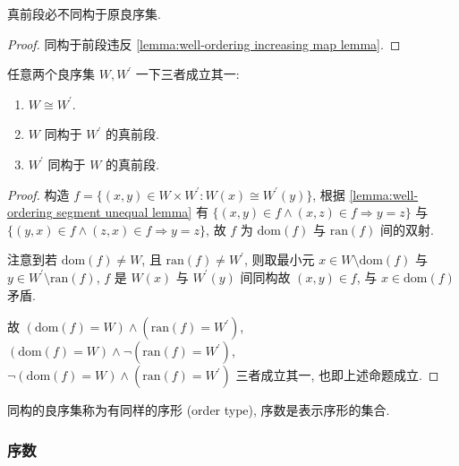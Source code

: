 \begin{lemma}
    \label{lemma:well-ordering segment unequal lemma}
    真前段必不同构于原良序集.

    \begin{proof}
        同构于前段违反 \ref{lemma:well-ordering increasing map lemma}.
    \end{proof}
\end{lemma}

\begin{theorem}
    \label{theorem:well-ordering segment equal theorem}
    任意两个良序集 \(W, W^\prime\) 一下三者成立其一:
    \begin{enumerate}
        \item \(W \cong W^\prime\).
        \item \(W\) 同构于 \(W^\prime\) 的真前段.
        \item \(W^\prime\) 同构于 \(W\) 的真前段.
    \end{enumerate}

    \begin{proof}
        构造 \(f = \{(x,y) \in W \times W^\prime : W(x) \cong W^\prime(y)\}\),
        根据 \ref{lemma:well-ordering segment unequal lemma} 有 \(\{(x,y) \in f \wedge (x,z) \in f \Rightarrow y = z\}\) 与
        \(\{(y,x) \in f \wedge (z,x) \in f \Rightarrow y=z\}\), 
        故 \(f\) 为 \(\mathrm{dom} (f)\) 与 \(\mathrm{ran} (f)\) 间的双射.

        注意到若 \(\mathrm{dom} (f) \neq W\), 且 \(\mathrm{ran} (f) \neq W^\prime\),
        则取最小元 \(x \in W \setminus \mathrm{dom} (f)\) 与 \(y \in W^\prime \setminus \mathrm{ran} (f)\),
        \(f\) 是 \(W(x)\) 与 \(W^\prime(y)\) 间同构故 \((x,y) \in f\), 与 \(x \in \mathrm{dom} (f)\) 矛盾.

        故 \((\mathrm{dom} (f) = W) \wedge (\mathrm{ran} (f) = W^\prime)\), \((\mathrm{dom} (f) = W) \wedge \neg(\mathrm{ran} (f) = W^\prime)\), 
        \(\neg(\mathrm{dom} (f) = W) \wedge (\mathrm{ran} (f) = W^\prime)\) 三者成立其一, 也即上述命题成立.
    \end{proof}
\end{theorem}

\begin{definition}
    同构的良序集称为有同样的序形 (order type), 序数是表示序形的集合.
\end{definition}

\subsubsection{序数}

